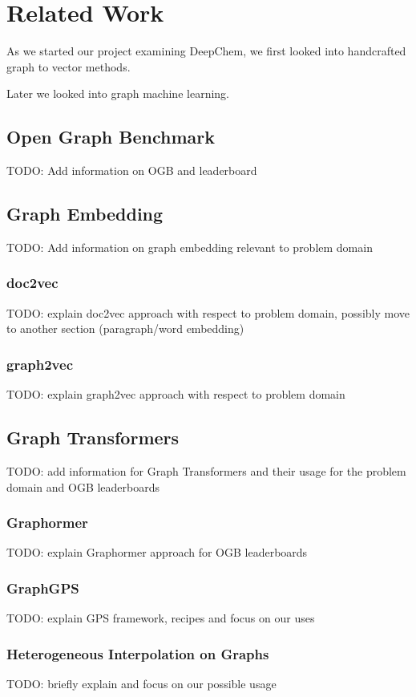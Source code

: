 \section{Related Work}

As we started our project examining DeepChem, we first looked into handcrafted graph to vector methods.

Later we looked into graph machine learning.

\subsection{Open Graph Benchmark}
TODO: Add information on OGB and leaderboard

\subsection{Graph Embedding}
TODO: Add information on graph embedding relevant to problem domain

\subsubsection{doc2vec}
TODO: explain doc2vec approach with respect to problem domain, possibly move to another section (paragraph/word embedding)

\subsubsection{graph2vec}
TODO: explain graph2vec approach with respect to problem domain

\subsection{Graph Transformers}
TODO: add information for Graph Transformers and their usage for the problem domain and OGB leaderboards

\subsubsection{Graphormer}
TODO: explain Graphormer approach for OGB leaderboards

\subsubsection{GraphGPS}
TODO: explain GPS framework, recipes and focus on our uses

\subsubsection{Heterogeneous Interpolation on Graphs}
TODO: briefly explain and focus on our possible usage

